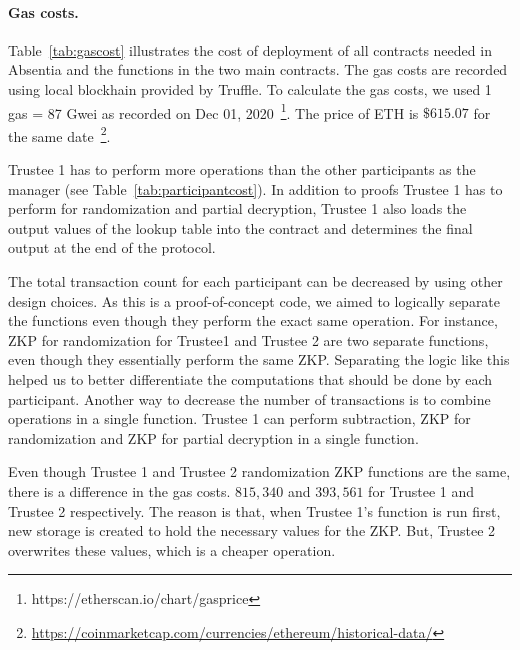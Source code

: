 
 





\paragraph{Gas costs.} 


Table~\ref{tab:gascost} illustrates the cost of deployment of all contracts needed in Absentia and the functions in the two main contracts. The gas costs are recorded using local blockhain provided by Truffle. To calculate the gas costs, we used 1 gas = 87 Gwei as recorded on Dec 01, 2020~\footnote{https://etherscan.io/chart/gasprice}. The price of ETH is $\$615.07$ for the same date~\footnote{\url{https://coinmarketcap.com/currencies/ethereum/historical-data/}}. %

Trustee 1 has to perform more operations than the other participants as the manager (see Table~\ref{tab:participantcost}). In addition to proofs Trustee 1 has to perform for randomization and partial decryption, Trustee 1 also loads the output values of the lookup table into the contract and determines the final output at the end of the protocol.

The total transaction count for each participant can be decreased by using other design choices. As this is a proof-of-concept code, we aimed to logically separate the functions even though they perform the exact same operation. For instance, ZKP for randomization for Trustee1 and Trustee 2 are two separate functions, even though they essentially perform the same ZKP. Separating the logic like this helped us to better differentiate the computations that should be done by each participant. Another way to decrease the number of transactions is to combine operations in a single function. Trustee 1 can perform subtraction, ZKP for randomization and ZKP for partial decryption in a single function.

Even though Trustee 1 and Trustee 2 randomization ZKP functions are the same, there is a difference in the gas costs. $815,340$ and $393,561$ for Trustee 1 and Trustee 2 respectively. The reason is that, when Trustee 1's function is run first, new storage is created to hold the necessary values for the ZKP. But, Trustee 2 overwrites these values, which is a cheaper operation.


